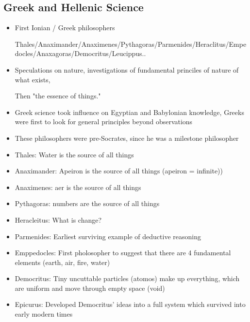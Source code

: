 \documentclass{article}
\begin{document}
\subsection{Greek and Hellenic Science}
\begin{itemize}
  \item First Ionian / Greek philosophers

    Thales/Anaximander/Anaximenes/Pythagoras/Parmenides/Heraclitus/Empedocles/Anaxagoras/Democritus/Leucippus..
  \item Speculations on nature, investigations of fundamental princiles of nature of what exists,

    Then "the essence of things."
  \item Greek science took influence on Egyptian and Babylonian knowledge,
    Greeks were first to look for general principles beyond observations
  \item These philosophers were pre-Socrates, since he was a milestone philosopher
  \item Thales: Water is the source of all things
  \item Anaximander: Apeiron is the source of all things (apeiron = infinite))
  \item Anaximenes: aer is the source of all things
  \item Pythagoras: numbers are the source of all things
  \item Heracleitus: What is change?
  \item Parmenides: Earliest surviving example of deductive reasoning
  \item Emppedocles: First pholosopher to suggest that there are 4 fundamental elements
    (earth, air, fire, water)
  \item Democritus: Tiny uncuttable particles (atomos) make up everything,
    which are uniform and move through empty space (void)
  \item Epicurus: Developed Democritus' ideas into a full system which survived into
    early modern times
\end{itemize}
\end{document}
